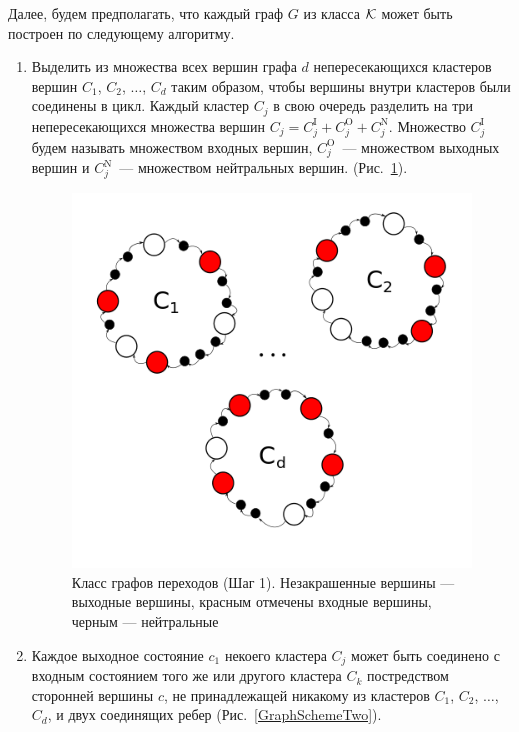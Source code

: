 Далее, будем предполагать, что каждый граф $G$ из класса ${\cal K}$ может быть построен по следующему алгоритму.
\begin{enumerate}
\item Выделить из множества всех вершин графа $d$ непересекающихся кластеров вершин $C_1$, $C_2$, $\ldots$, $C_d$ таким образом, чтобы вершины внутри кластеров были соединены в цикл. Каждый кластер $C_j$ в свою очередь разделить на три непересекающихся множества вершин $C_j=C_j^{\mathrm{I}} + C_j^{\mathrm{O}} + C_j^{\mathrm{N}}$. Множество $C_j^{\mathrm{I}}$ будем называть множеством входных вершин, $C_j^{\mathrm{O}}$~--- множеством выходных вершин и $C_j^{\mathrm{N}}$~--- множеством нейтральных вершин. (Рис.~\ref{GraphSchemeOne}).

\begin{figure}[h]
\includegraphics[scale=0.4]{GraphScheme1.png} 
\caption{Класс графов переходов (Шаг 1). Незакрашенные вершины --- выходные вершины, красным отмечены входные вершины, черным --- нейтральные}
\label{GraphSchemeOne}
\end{figure}
\item Каждое выходное состояние $c_1$ некоего кластера $C_j$ может быть соединено с входным состоянием того же или другого кластера $C_k$ постредством сторонней вершины $c$, не принадлежащей никакому из кластеров $C_1$, $C_2$, $\ldots$, $C_d$, и двух соединящих ребер (Рис.~\ref{GraphSchemeTwo}).
\begin{figure}[h]

\end{figure}
\end{enumerate}

